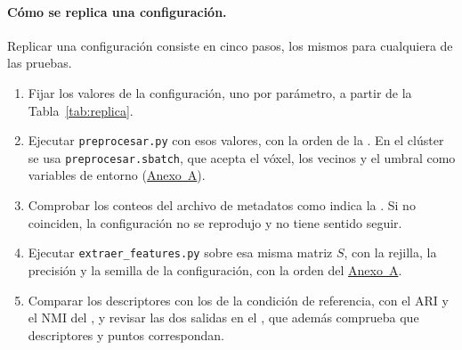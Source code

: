 \paragraph*{Cómo se replica una configuración.}
Replicar una configuración consiste en cinco pasos, los mismos para cualquiera
de las pruebas.
\begin{enumerate}
\item Fijar los valores de la configuración, uno por parámetro, a partir de la
Tabla~\ref{tab:replica}.
\item Ejecutar \texttt{preprocesar.py} con esos valores, con la orden de la
. En el clúster se
usa \texttt{preprocesar.sbatch}, que acepta el vóxel, los vecinos y el umbral
como variables de entorno (\hyperref[sec:anexo-software]{Anexo~A}).
\item Comprobar los conteos del archivo de metadatos como indica la
. Si no coinciden,
la configuración no se reprodujo y no tiene sentido seguir.
\item Ejecutar \texttt{extraer\_features.py} sobre esa misma matriz $S$, con la
rejilla, la precisión y la semilla de la configuración, con la orden del
\hyperref[sec:anexo-software]{Anexo~A}.
\item Comparar los descriptores con los de la condición de referencia, con el
ARI y el NMI del , y revisar las dos
salidas en el , que además comprueba que descriptores y
puntos correspondan.
\end{enumerate}

